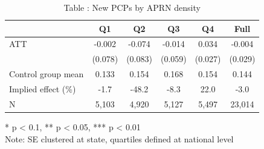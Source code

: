 \begin{table}[t]
\caption*{
{\fontsize{20}{25}\selectfont  Table : New PCPs by APRN density\fontsize{12}{15}\selectfont }
} 
\fontsize{12.0pt}{14.0pt}\selectfont
\begin{tabular*}{\linewidth}{@{\extracolsep{\fill}}lccccc}
\toprule
  & Q1 & Q2 & Q3 & Q4 & Full \\ 
\midrule\addlinespace[2.5pt]
ATT & -0.002 & -0.074 & -0.014 & 0.034 & -0.004 \\ 
 & (0.078) & (0.083) & (0.059) & (0.027) & (0.029) \\ 
Control group mean & 0.133 & 0.154 & 0.168 & 0.154 & 0.144 \\ 
Implied effect (\%) & -1.7 & -48.2 & -8.3 & 22.0 & -3.0 \\ 
N & 5,103 & 4,920 & 5,127 & 5,497 & 23,014 \\ 
\bottomrule
\end{tabular*}
\begin{minipage}{\linewidth}
* p < 0.1, ** p < 0.05, *** p < 0.01\\
Note: SE clustered at state, quartiles defined at national level\\
\end{minipage}
\end{table}

